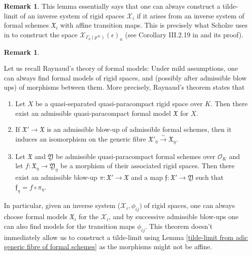 \documentclass[10pt,oneside]{amsart}
\theoremstyle{definition}
\newtheorem{remark}[theorem]{Remark}
\begin{document}
	\begin{remark}
	This lemma essentially says that one can always construct a tilde-limit of an inverse system of rigid spaces $\mathcal X_i$ if it arises from an inverse system of formal schemes $\mathfrak X_i$ with affine transition maps. This is precisely what Scholze uses in \cite{torsion} to construct the space $\mathcal X_{\Gamma_0(p^\infty)}(\epsilon)_a$ (see Corollary III.2.19 in \cite{torsion} and its proof).
	\end{remark}
	
	
 	\begin{remark} \label{Raynaud theory main theorem}
			
	Let us recall Raynaud's theory of formal models: Under mild assumptions,
	one can always find formal models of rigid spaces, and (possibly after admissible blow ups) of morphisms between them. More precisely, Raynaud's theorem \cite[section 8.4]{Bosch lectures} states that
		
		\begin{enumerate}
			\item Let $X$ be a quasi-separated quasi-paracompact rigid space over $K$. Then there exist an admissible quasi-paracompact formal model $\mathfrak X$ for $X$.
			\item If $\mathfrak X'\rightarrow \mathfrak X$ is an admissible blow-up of admissible formal schemes, then it induces an isomorphism on the generic fibre  $\mathfrak X'_\eta \xrightarrow{\sim} \mathfrak X_\eta$.
			\item Let $\mathfrak X$ and $\mathfrak Y$ be admissible quasi-paracompact formal schemes over $\mathcal O_K$ and let $f:\mathfrak X_\eta \rightarrow \mathfrak Y_\eta$ be a morphism of their associated rigid spaces. Then there exist an admissible blow-up $\pi:\mathfrak X'\rightarrow \mathfrak X$ and a map $\mathfrak f:\mathfrak X'\rightarrow \mathfrak Y$ such that $\mathfrak f_\eta = f\circ \pi_\eta$.
		\end{enumerate}
		In particular, given an inverse system ($\mathcal X_i,\phi_{ij})$ of rigid spaces, one can always choose formal models $\mathfrak X_i$ for the $\mathcal X_i$, and by successive admissible blow-ups one can also find models for the transition maps $\phi_{ij}$. This theorem doesn't immediately allow us to construct a tilde-limit using Lemma \ref{tilde-limit from adic generic fibre of formal schemes} as the morphisms might not be affine.
		\end{remark}
		
\end{document}

